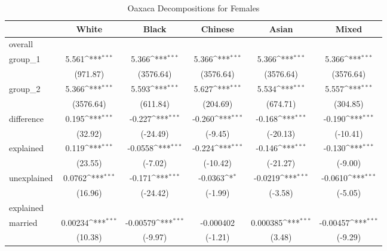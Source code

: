 \begin{table}[htbp]\centering
\def\sym#1{\ifmmode^{#1}\else\(^{#1}\)\fi}
\caption{Oaxaca Decompositions for Females\label{tab1}}
\begin{tabular}{l*{5}{c}}
\hline\hline
            &\multicolumn{1}{c}{White}&\multicolumn{1}{c}{Black}&\multicolumn{1}{c}{Chinese}&\multicolumn{1}{c}{Asian}&\multicolumn{1}{c}{Mixed}\\
\hline
overall     &                     &                     &                     &                     &                     \\
group\_1     &       5.561\sym{***}&       5.366\sym{***}&       5.366\sym{***}&       5.366\sym{***}&       5.366\sym{***}\\
            &    (971.87)         &   (3576.64)         &   (3576.64)         &   (3576.64)         &   (3576.64)         \\
group\_2     &       5.366\sym{***}&       5.593\sym{***}&       5.627\sym{***}&       5.534\sym{***}&       5.557\sym{***}\\
            &   (3576.64)         &    (611.84)         &    (204.69)         &    (674.71)         &    (304.85)         \\
difference  &       0.195\sym{***}&      -0.227\sym{***}&      -0.260\sym{***}&      -0.168\sym{***}&      -0.190\sym{***}\\
            &     (32.92)         &    (-24.49)         &     (-9.45)         &    (-20.13)         &    (-10.41)         \\
explained   &       0.119\sym{***}&     -0.0558\sym{***}&      -0.224\sym{***}&      -0.146\sym{***}&      -0.130\sym{***}\\
            &     (23.55)         &     (-7.02)         &    (-10.42)         &    (-21.27)         &     (-9.00)         \\
unexplained &      0.0762\sym{***}&      -0.171\sym{***}&     -0.0363\sym{*}  &     -0.0219\sym{***}&     -0.0610\sym{***}\\
            &     (16.96)         &    (-24.42)         &     (-1.99)         &     (-3.58)         &     (-5.05)         \\
\hline
explained   &                     &                     &                     &                     &                     \\
married     &     0.00234\sym{***}&    -0.00579\sym{***}&   -0.000402         &    0.000385\sym{***}&    -0.00457\sym{***}\\
            &     (10.38)         &     (-9.97)         &     (-1.21)         &      (3.48)         &     (-9.29)         \\

\end{tabular}
\end{table}
